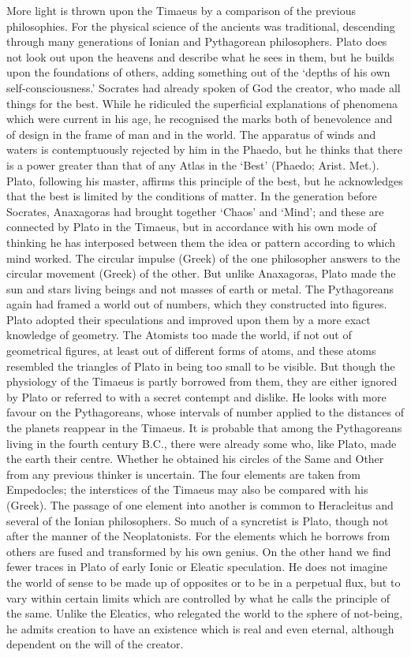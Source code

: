 \documentclass[11pt,letter]{article}
\begin{document}
\par  More light is thrown upon the Timaeus by a comparison of the previous philosophies. For the physical science of the ancients was traditional, descending through many generations of Ionian and Pythagorean philosophers. Plato does not look out upon the heavens and describe what he sees in them, but he builds upon the foundations of others, adding something out of the ‘depths of his own self-consciousness.’ Socrates had already spoken of God the creator, who made all things for the best. While he ridiculed the superficial explanations of phenomena which were current in his age, he recognised the marks both of benevolence and of design in the frame of man and in the world. The apparatus of winds and waters is contemptuously rejected by him in the Phaedo, but he thinks that there is a power greater than that of any Atlas in the ‘Best’ (Phaedo; Arist. Met.). Plato, following his master, affirms this principle of the best, but he acknowledges that the best is limited by the conditions of matter. In the generation before Socrates, Anaxagoras had brought together ‘Chaos’ and ‘Mind’; and these are connected by Plato in the Timaeus, but in accordance with his own mode of thinking he has interposed between them the idea or pattern according to which mind worked. The circular impulse (Greek) of the one philosopher answers to the circular movement (Greek) of the other. But unlike Anaxagoras, Plato made the sun and stars living beings and not masses of earth or metal. The Pythagoreans again had framed a world out of numbers, which they constructed into figures. Plato adopted their speculations and improved upon them by a more exact knowledge of geometry. The Atomists too made the world, if not out of geometrical figures, at least out of different forms of atoms, and these atoms resembled the triangles of Plato in being too small to be visible. But though the physiology of the Timaeus is partly borrowed from them, they are either ignored by Plato or referred to with a secret contempt and dislike. He looks with more favour on the Pythagoreans, whose intervals of number applied to the distances of the planets reappear in the Timaeus. It is probable that among the Pythagoreans living in the fourth century B.C., there were already some who, like Plato, made the earth their centre. Whether he obtained his circles of the Same and Other from any previous thinker is uncertain. The four elements are taken from Empedocles; the interstices of the Timaeus may also be compared with his (Greek). The passage of one element into another is common to Heracleitus and several of the Ionian philosophers. So much of a syncretist is Plato, though not after the manner of the Neoplatonists. For the elements which he borrows from others are fused and transformed by his own genius. On the other hand we find fewer traces in Plato of early Ionic or Eleatic speculation. He does not imagine the world of sense to be made up of opposites or to be in a perpetual flux, but to vary within certain limits which are controlled by what he calls the principle of the same. Unlike the Eleatics, who relegated the world to the sphere of not-being, he admits creation to have an existence which is real and even eternal, although dependent on the will of the creator. 
\end{document}

